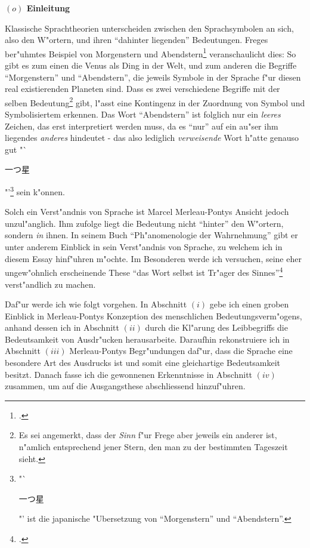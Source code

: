 \documentclass[a4paper, 12pt]{article}
\begin{document}
\begin{onehalfspace} 

\noindent\textbf{$(o)$ Einleitung}

\noindent Klassische Sprachtheorien unterscheiden zwischen den Sprachsymbolen an sich, also den W"ortern, und ihren "`dahinter liegenden"' Bedeutungen. Freges ber"uhmtes Beispiel von Morgenstern und Abendstern\footnote{\cite{sinnundbedeutung}.} veranschaulicht dies: So gibt es zum einen die Venus als Ding in der Welt, und zum anderen die Begriffe "`Morgenstern"' und "`Abendstern"', die jeweils Symbole in der Sprache f"ur diesen real existierenden Planeten sind. Dass es zwei verschiedene Begriffe mit der selben Bedeutung\footnote{Es sei angemerkt, dass der \emph{Sinn} f"ur Frege aber jeweils ein anderer ist, n"amlich entsprechend jener Stern, den man zu der bestimmten Tageszeit sieht.} gibt, l"asst eine Kontingenz in der Zuordnung von Symbol und Symbolisiertem erkennen. Das Wort "`Abendstern"' ist folglich nur ein \emph{leeres} Zeichen, das erst interpretiert werden muss, da es "`nur"' auf ein au"ser ihm liegendes \emph{anderes} hindeutet - das also lediglich \emph{verweisende} Wort h"atte genauso gut "`\begin{CJK}{UTF8}{min}一つ星\end{CJK}"'\footnote{"`\begin{CJK}{UTF8}{min}一つ星\end{CJK}"' ist die japanische "Ubersetzung von "`Morgenstern"' und "`Abendstern"'.} sein k"onnen.

Solch ein Verst"andnis von Sprache ist Marcel Merleau-Pontys Ansicht jedoch unzul"anglich. Ihm zufolge liegt die Bedeutung nicht "`hinter"' den W"ortern, sondern \emph{in} ihnen. In seinem Buch "`Ph"anomenologie der Wahrnehmung"' \citep{merleau1966phanomenologie} gibt er unter anderem Einblick in sein Verst"andnis von Sprache, zu welchem ich in diesem Essay hinf"uhren m"ochte. Im Besonderen werde ich versuchen, seine eher ungew"ohnlich erscheinende These "`das Wort selbst ist Tr"ager des Sinnes"'\footnote{\cite[S. 211]{merleau1966phanomenologie}.} verst"andlich zu machen.\newline

Daf"ur werde ich wie folgt vorgehen. In Abschnitt $(i)$ gebe ich einen groben Einblick in Merleau-Pontys Konzeption des menschlichen Bedeutungsverm"ogens, anhand dessen ich in Abschnitt $(ii)$ durch die Kl"arung des Leibbegriffs die Bedeutsamkeit von Ausdr"ucken herausarbeite. Daraufhin rekonstruiere ich in Abschnitt $(iii)$ Merleau-Pontys Begr"undungen daf"ur, dass die Sprache eine besondere Art des Ausdrucks ist und somit eine gleichartige Bedeutsamkeit besitzt. Danach fasse ich die gewonnenen Erkenntnisse in Abschnitt $(iv)$ zusammen, um auf die Ausgangsthese abschliessend hinzuf"uhren.


\end{onehalfspace}
\end{document}
